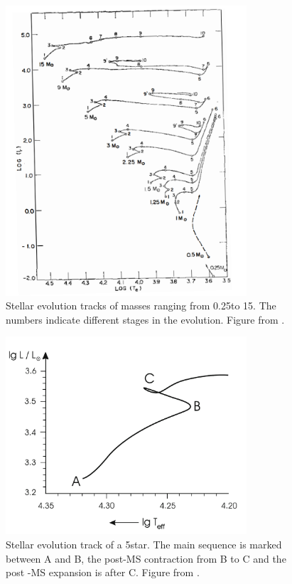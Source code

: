 \begin{figure}[htbp]
    \centering
    \includegraphics[width=0.8\textwidth,angle=-1]{iben.png}
    \caption{\citep{kippenhahn1990stellar} Stellar evolution tracks of masses ranging from 0.25\msun to 15\msun. The numbers indicate different stages in the evolution. Figure from \citet{iben1967stellar}.}
    \label{stages}
\end{figure}

\begin{figure}[htbp]
	\centering
	\includegraphics[width=0.8\textwidth]{STAGES.png}
	\caption{\citep{kippenhahn1990stellar} Stellar evolution track of a 5\msun star. The main sequence is marked between A and B, the post-MS contraction from B to C and the post -MS expansion is after C. Figure from \citep{kippenhahn1990stellar}.}
	\label{stages2}
\end{figure}

